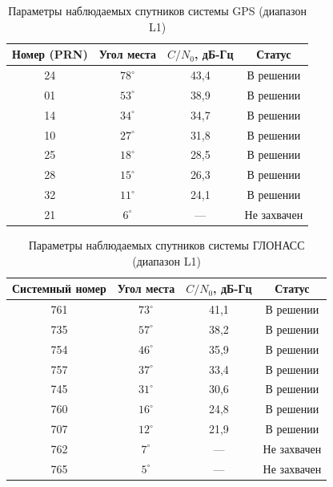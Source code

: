 \begin{table}[H]
    \centering
    \small
    \caption{Параметры наблюдаемых спутников системы GPS (диапазон L1)}
    \label{tab:gps_details}
    \begin{tabular}{|c|c|c|c|}
        \hline
        Номер (PRN) & Угол места & $C/N_0$, дБ-Гц & Статус \\
        \hline
        24 & $78^\circ$ & 43,4 & В решении \\
        \hline
        01 & $53^\circ$ & 38,9 & В решении \\
        \hline
        14 & $34^\circ$ & 34,7 & В решении \\
        \hline
        10 & $27^\circ$ & 31,8 & В решении \\
        \hline
        25 & $18^\circ$ & 28,5 & В решении \\
        \hline
        28 & $15^\circ$ & 26,3 & В решении \\
        \hline
        32 & $11^\circ$ & 24,1 & В решении \\
        \hline
        21 & $6^\circ$ & --- & Не захвачен \\
        \hline
    \end{tabular}
\end{table}

\begin{table}[H]
    \centering
    \small
    \caption{Параметры наблюдаемых спутников системы ГЛОНАСС (диапазон L1)}
    \label{tab:glo_details}
    \begin{tabular}{|c|c|c|c|}
        \hline
        Системный номер & Угол места & $C/N_0$, дБ-Гц & Статус \\
        \hline
        761 & $73^\circ$ & 41,1 & В решении \\
        \hline
        735 & $57^\circ$ & 38,2 & В решении \\
        \hline
        754 & $46^\circ$ & 35,9 & В решении \\
        \hline
        757 & $37^\circ$ & 33,4 & В решении \\
        \hline
        745 & $31^\circ$ & 30,6 & В решении \\
        \hline
        760 & $16^\circ$ & 24,8 & В решении \\
        \hline
        707 & $12^\circ$ & 21,9 & В решении \\
        \hline
        762 & $7^\circ$ & --- & Не захвачен \\
        \hline
        765 & $5^\circ$ & --- & Не захвачен \\
        \hline
    \end{tabular}
\end{table}

